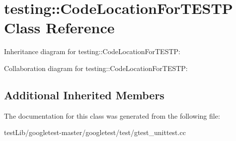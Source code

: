 \hypertarget{classtesting_1_1CodeLocationForTESTP}{}\section{testing\+:\+:Code\+Location\+For\+T\+E\+S\+TP Class Reference}
\label{classtesting_1_1CodeLocationForTESTP}


Inheritance diagram for testing\+:\+:Code\+Location\+For\+T\+E\+S\+TP\+:


Collaboration diagram for testing\+:\+:Code\+Location\+For\+T\+E\+S\+TP\+:
\subsection*{Additional Inherited Members}


The documentation for this class was generated from the following file\+:\begin{DoxyCompactItemize}
\item 
test\+Lib/googletest-\/master/googletest/test/gtest\+\_\+unittest.\+cc\end{DoxyCompactItemize}
